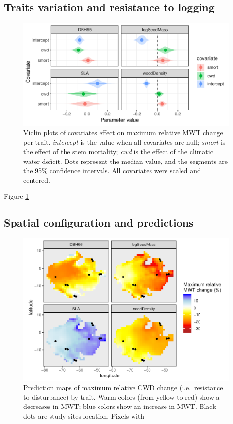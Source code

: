 \documentclass[]{elsarticle} %
\makeatletter
\def\maxwidth{\ifdim\Gin@nat@width>\linewidth\linewidth
\else\Gin@nat@width\fi}
\let\Oldincludegraphics\includegraphics
\renewcommand{\includegraphics}[1]{\Oldincludegraphics[width=\maxwidth]{#1}}
\makeatother
\begin{document}
\subsection{Traits variation and resistance to
logging}\label{traits-variation-and-resistance-to-logging}

\begin{figure}
\centering
\includegraphics{rticle_tmfo_functional_files/figure-latex/lambdas-1.pdf}
\caption{\label{fig:lambdas}Violin plots of covariates effect on maximum
relative MWT change per trait. \emph{intercept} is the value when all
covariates are null; \emph{smort} is the effect of the stem mortality;
\emph{cwd} is the effect of the climatic water deficit. Dots represent
the median value, and the segments are the 95\% confidence intervals.
All covariates were scaled and centered.}
\end{figure}

Figure \ref{fig:lambdas}

\subsection{Spatial configuration and
predictions}\label{spatial-configuration-and-predictions}

\begin{figure}
\centering
\includegraphics{rticle_tmfo_functional_files/figure-latex/maps_pred-1.pdf}
\caption{Prediction maps of maximum relative CWD change (i.e.~resistance
to disturbance) by trait. Warm colors (from yellow to red) show a
decreases in MWT; blue colors show an increase in MWT. Black dots are
study sites location. Pixels with}
\end{figure}
\end{document}
